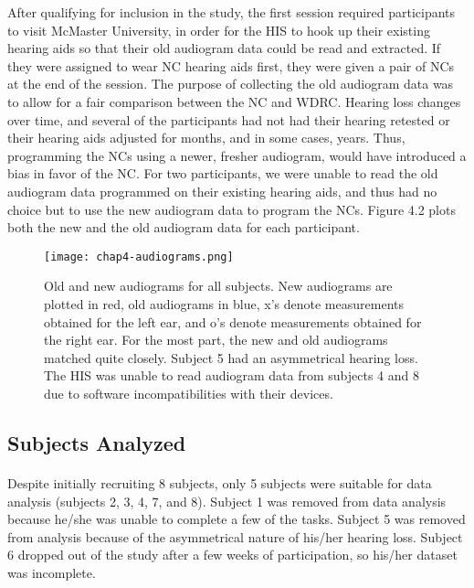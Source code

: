 After qualifying for inclusion in the study, the first session required participants to visit McMaster University, in order for the HIS to hook up their existing hearing aids so that their old audiogram data could be read and extracted.  If they were assigned to wear NC hearing aids first, they were given a pair of NCs at the end of the session.  The purpose of collecting the old audiogram data was to allow for a fair comparison between the NC and WDRC.  Hearing loss changes over time, and several of the participants had not had their hearing retested or their hearing aids adjusted for months, and in some cases, years.  Thus, programming the NCs using a newer, fresher audiogram, would have introduced a bias in favor of the NC.  For two participants, we were unable to read the old audiogram data programmed on their existing hearing aids, and thus had no choice but to use the new audiogram data to program the NCs.  Figure 4.2 plots both the new and the old audiogram data for each participant.

\begin{figure}[htp]
\begin{center}
\texttt{[image: chap4-audiograms.png]}\\
\caption[NCStudy1 old and new audiograms for all subjects]{Old and new audiograms for all subjects.  New audiograms are plotted in red, old audiograms in blue, x's denote measurements obtained for the left ear, and o's denote measurements obtained for the right ear.  For the most part, the new and old audiograms matched quite closely.  Subject 5 had an asymmetrical hearing loss.  The HIS was unable to read audiogram data from subjects 4 and 8 due to software incompatibilities with their devices.}
\label{ch4-audiograms}
\end{center}
\end{figure}

\subsection{Subjects Analyzed}
\paragraph{}Despite initially recruiting 8 subjects, only 5 subjects were suitable for data analysis (subjects 2, 3, 4, 7, and 8).  Subject 1 was removed from data analysis because he/she was unable to complete a few of the tasks.  Subject 5 was removed from analysis because of the asymmetrical nature of his/her hearing loss.  Subject 6 dropped out of the study after a few weeks of participation, so his/her dataset was incomplete.

